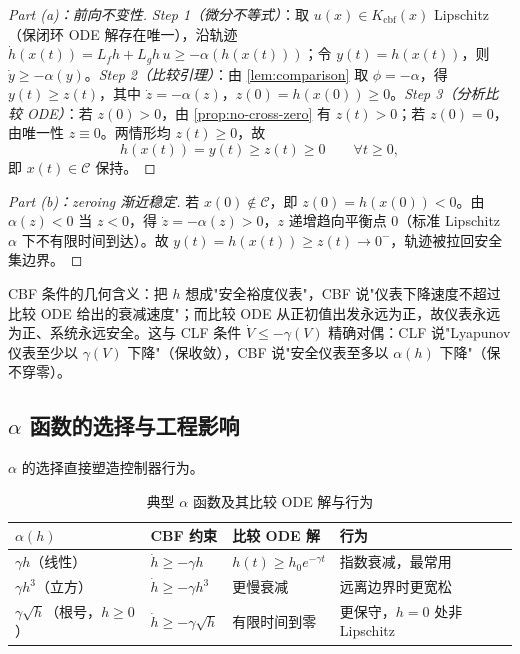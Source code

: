 \begin{proof}[Part (a)：前向不变性]
\emph{Step 1（微分不等式）}：取 $u(x)\in K_{\mathrm{cbf}}(x)$ Lipschitz（保闭环 ODE 解存在唯一），沿轨迹 $\dot h(x(t))=L_fh+L_gh\,u\ge-\alpha(h(x(t)))$；令 $y(t)=h(x(t))$，则 $\dot y\ge-\alpha(y)$。\emph{Step 2（比较引理）}：由 \cref{lem:comparison} 取 $\phi=-\alpha$，得 $y(t)\ge z(t)$，其中 $\dot z=-\alpha(z)$，$z(0)=h(x(0))\ge0$。\emph{Step 3（分析比较 ODE）}：若 $z(0)>0$，由 \cref{prop:no-cross-zero} 有 $z(t)>0$；若 $z(0)=0$，由唯一性 $z\equiv0$。两情形均 $z(t)\ge0$，故
\[
h(x(t))=y(t)\ge z(t)\ge0\qquad\forall t\ge0,
\]
即 $x(t)\in\mathcal C$ 保持。
\end{proof}

\begin{proof}[Part (b)：zeroing 渐近稳定]
若 $x(0)\notin\mathcal C$，即 $z(0)=h(x(0))<0$。由 $\alpha(z)<0$ 当 $z<0$，得 $\dot z=-\alpha(z)>0$，$z$ 递增趋向平衡点 $0$（标准 Lipschitz $\alpha$ 下不有限时间到达）。故 $y(t)=h(x(t))\ge z(t)\to0^-$，轨迹被拉回安全集边界。
\end{proof}

\begin{insight}[一枚硬币的两面]
CBF 条件的几何含义：把 $h$ 想成"安全裕度仪表"，CBF 说"仪表下降速度不超过比较 ODE 给出的衰减速度"；而比较 ODE 从正初值出发永远为正，故仪表永远为正、系统永远安全。这与 CLF 条件 $\dot V\le-\gamma(V)$ 精确对偶：CLF 说"Lyapunov 仪表至少以 $\gamma(V)$ 下降"（保收敛），CBF 说"安全仪表至多以 $\alpha(h)$ 下降"（保不穿零）。
\end{insight}

\subsection{\texorpdfstring{$\alpha$}{alpha} 函数的选择与工程影响}

$\alpha$ 的选择直接塑造控制器行为。

\begin{table}[H]\centering\small
\caption{典型 $\alpha$ 函数及其比较 ODE 解与行为}
\label{tab:alpha-choice}
\begin{tabular}{llll}
\toprule
$\alpha(h)$ & CBF 约束 & 比较 ODE 解 & 行为 \\
\midrule
$\gamma h$（线性） & $\dot h\ge-\gamma h$ & $h(t)\ge h_0e^{-\gamma t}$ & 指数衰减，最常用 \\
$\gamma h^3$（立方） & $\dot h\ge-\gamma h^3$ & 更慢衰减 & 远离边界时更宽松 \\
$\gamma\sqrt h$（根号，$h\ge0$） & $\dot h\ge-\gamma\sqrt h$ & 有限时间到零 & 更保守，$h=0$ 处非 Lipschitz \\
\bottomrule
\end{tabular}
\end{table}

